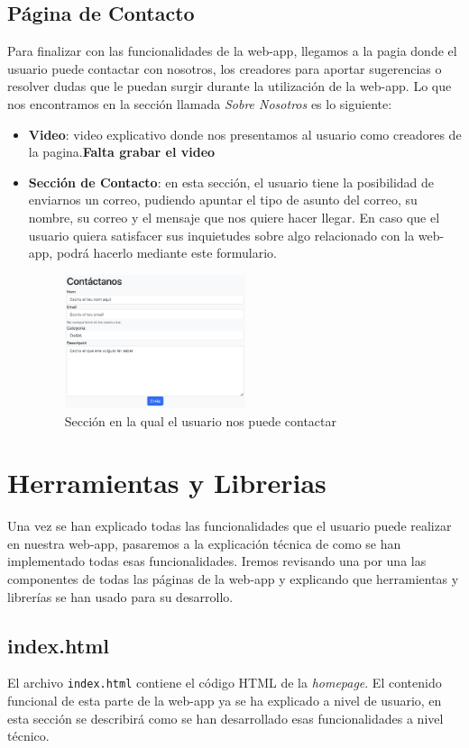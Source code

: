 \documentclass{article}
\begin{document}
\subsection{Página de Contacto}
Para finalizar con las funcionalidades de la web-app, llegamos a la pagia donde el usuario puede contactar con nosotros, los creadores para aportar sugerencias o resolver dudas que le puedan surgir durante la utilización de la web-app. Lo que nos encontramos en la sección llamada \textit{Sobre Nosotros} es lo siguiente:

\begin{itemize}
    \item \textbf{Video}: video explicativo donde nos presentamos al usuario como creadores de la pagina.\textbf{Falta grabar el video}
    \item \textbf{Sección de Contacto}: en esta sección, el usuario tiene la posibilidad de enviarnos un correo, pudiendo apuntar el tipo de asunto del correo, su nombre, su correo y el mensaje que nos quiere hacer llegar. En caso que el usuario quiera satisfacer sus inquietudes sobre algo relacionado con la web-app, podrá hacerlo mediante este formulario.
    \begin{figure}[ht]
        \centering
        \includegraphics[width=0.5\textwidth]{images/contacto.png}
        \caption{Sección en la qual el usuario nos puede contactar}
    \end{figure}
\end{itemize}
\newpage
\section{Herramientas y Librerias}
Una vez se han explicado todas las funcionalidades que el usuario puede realizar en nuestra web-app, pasaremos a la explicación técnica de como se han implementado todas esas funcionalidades. Iremos revisando una por una las componentes de todas las páginas de la web-app y explicando que herramientas y librerías se han usado para su desarrollo.
\subsection{index.html}
El archivo \texttt{index.html} contiene el código HTML de la \textit{homepage}. El contenido funcional de esta parte de la web-app ya se ha explicado a nivel de usuario, en esta sección se describirá como se han desarrollado esas funcionalidades a nivel técnico.
\end{document}
